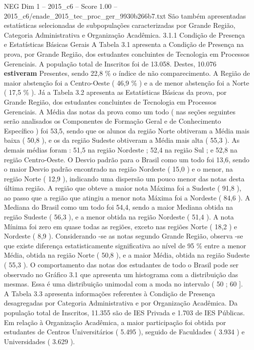 \begin{textsample}{NEG Dim 1 – 2015\_c6 – Score 1.00 – 2015\_c6/enade\_2015\_tec\_proc\_ger\_9930b266b7.txt}
São também apresentadas estatísticas selecionadas de subpopulações caracterizadas por Grande Região, Categoria Administrativa e Organização Acadêmica. 3.1.1 Condição de Presença e Estatísticas Básicas Gerais A Tabela 3.1 apresenta a Condição de Presença na prova, por Grande Região, dos estudantes concluintes de Tecnologia em Processos Gerenciais.
A população total de Inscritos foi de 13.058.
Destes, 10.076 \textbf{estiveram} Presentes, sendo 22,8 \% o índice de não comparecimento.
A Região de maior abstenção foi a Centro-Oeste ( 46,9 \% ) e a de menor abstenção foi a Norte ( 17,5 \% ).
Já a Tabela 3.2 apresenta as Estatísticas Básicas da prova, por Grande Região, dos estudantes concluintes de Tecnologia em Processos Gerenciais.
A Média das notas da prova como um todo ( nas seções seguintes serão analisados os Componentes de Formação Geral e de Conhecimento Específico ) foi 53,5, sendo que os alunos da região Norte obtiveram a Média mais baixa ( 50,8 ), e os da região Sudeste obtiveram a Média mais alta ( 55,3 ).
As demais médias foram : 51,5 na região Nordeste ; 52,4 na região Sul ; e 52,8 na região Centro-Oeste.
O Desvio padrão para o Brasil como um todo foi 13,6, sendo o maior Desvio padrão encontrado na região Nordeste ( 15,0 ) e o menor, na região Norte ( 12,9 ), indicando uma dispersão um pouco menor das notas desta última região.
A região que obteve a maior nota Máxima foi a Sudeste ( 91,8 ), ao passo que a região que atingiu a menor nota Máxima foi a Nordeste ( 84,6 ).
A Mediana do Brasil como um todo foi 54,4, sendo a maior Mediana obtida na região Sudeste ( 56,3 ), e a menor obtida na região Nordeste ( 51,4 ).
A nota Mínima foi zero em quase todas as regiões, exceto nas regiões Norte ( 18,2 ) e Nordeste ( 8,9 ).
Considerando -se as notas segundo Grande Região, observa -se que existe diferença estatisticamente significativa ao nível de 95 \% entre a menor Média, obtida na região Norte ( 50,8 ), e a maior Média, obtida na região Sudeste ( 55,3 ).
O comportamento das notas dos estudantes de todo o Brasil pode ser observado no Gráfico 3.1 que apresenta um histograma com a distribuição das mesmas.
Essa é uma distribuição unimodal com a moda no intervalo ( 50 ; 60 ].
A Tabela 3.3 apresenta informações referentes à Condição de Presença desagregadas por Categoria Administrativa e por Organização Acadêmica.
Da população total de Inscritos, 11.355 são de IES Privada e 1.703 de IES Públicas.
Em relação à Organização Acadêmica, a maior participação foi obtida por estudantes de Centros Universitários ( 5.495 ), seguido de Faculdades ( 3.934 ) e Universidades ( 3.629 ).

\end{textsample}
